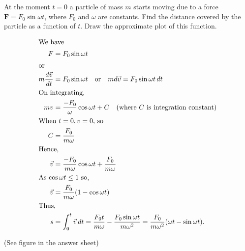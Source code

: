 \item At the moment \( t = 0 \) a particle of mass \( m \) starts moving due to a force \( \mathbf{F} = F_0 \sin \omega t \), where \( F_0 \) and \(\omega\) are constants. Find the distance covered by the particle as a function of \( t \). Draw the approximate plot of this function.
    \begin{center}
    \end{center}\begin{solution}
    \begin{align*}
        \intertext{We have}
        F &= F_0\sin \omega t\\
        \intertext{or}
        m \dfrac{d\vec{v}}{dt} &= F_0\sin \omega t \quad \text{or} \quad m d\vec{v} = F_0\sin \omega t \, dt\\
        \intertext{On integrating,}
        mv &= \dfrac{-F_0}{\omega} \cos \omega t + C \quad \text{(where $C$ is integration constant)}\\
        \intertext{When $t=0, v=0,$ so}
        C &= \dfrac{F_0}{m \omega}\\
        \intertext{Hence,}
        \vec{v} &= \dfrac{-F_0}{m \omega} \cos \omega t + \dfrac{F_0}{m \omega}\\
        \intertext{As $\cos \omega t \leq 1$ so,}
        \vec{v} &= \dfrac{F_0}{m \omega} (1 - \cos \omega t)\\
        \intertext{Thus,}
        s &= \int_{0}^{t} \vec{v}\, dt = \dfrac{F_0 t}{m \omega} - \dfrac{F_0 \sin \omega t}{m \omega^2} = \dfrac{F_0}{m \omega^2} (\omega t - \sin \omega t).
    \end{align*}
    \begin{center}(See figure in the answer sheet)\end{center}
\end{solution}